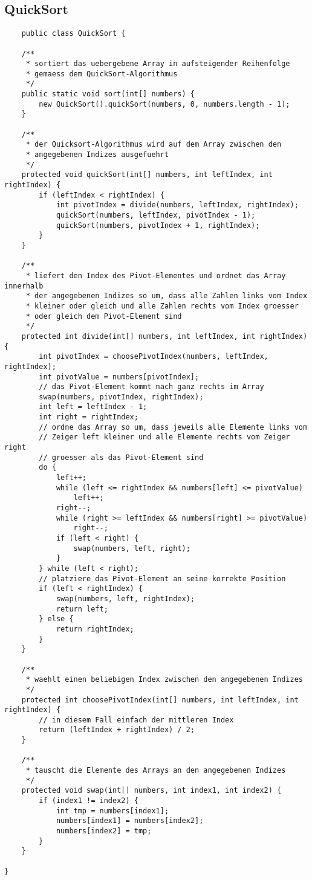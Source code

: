 \documentclass[12pt,a4paper,oneside,ngerman]{article}
\begin{document}
\subsection*{QuickSort}
\begin{lstlisting}
    public class QuickSort {

	/**
	 * sortiert das uebergebene Array in aufsteigender Reihenfolge
	 * gemaess dem QuickSort-Algorithmus
	 */
	public static void sort(int[] numbers) {
		new QuickSort().quickSort(numbers, 0, numbers.length - 1);
	}

	/**
	 * der Quicksort-Algorithmus wird auf dem Array zwischen den
	 * angegebenen Indizes ausgefuehrt
	 */
	protected void quickSort(int[] numbers, int leftIndex, int rightIndex) {
		if (leftIndex < rightIndex) {
			int pivotIndex = divide(numbers, leftIndex, rightIndex);
			quickSort(numbers, leftIndex, pivotIndex - 1);
			quickSort(numbers, pivotIndex + 1, rightIndex);
		}
	}

	/**
	 * liefert den Index des Pivot-Elementes und ordnet das Array innerhalb
	 * der angegebenen Indizes so um, dass alle Zahlen links vom Index
	 * kleiner oder gleich und alle Zahlen rechts vom Index groesser
	 * oder gleich dem Pivot-Element sind
	 */
	protected int divide(int[] numbers, int leftIndex, int rightIndex) {
		int pivotIndex = choosePivotIndex(numbers, leftIndex, rightIndex);
		int pivotValue = numbers[pivotIndex];
		// das Pivot-Element kommt nach ganz rechts im Array
		swap(numbers, pivotIndex, rightIndex);
		int left = leftIndex - 1;
		int right = rightIndex;
		// ordne das Array so um, dass jeweils alle Elemente links vom
		// Zeiger left kleiner und alle Elemente rechts vom Zeiger right
		// groesser als das Pivot-Element sind
		do {
			left++;
			while (left <= rightIndex && numbers[left] <= pivotValue)
				left++;
			right--;
			while (right >= leftIndex && numbers[right] >= pivotValue)
				right--;
			if (left < right) {
				swap(numbers, left, right);
			}
		} while (left < right);
		// platziere das Pivot-Element an seine korrekte Position
		if (left < rightIndex) {
			swap(numbers, left, rightIndex);
			return left;
		} else {
			return rightIndex;
		}
	}

	/**
	 * waehlt einen beliebigen Index zwischen den angegebenen Indizes
	 */
	protected int choosePivotIndex(int[] numbers, int leftIndex, int rightIndex) {
		// in diesem Fall einfach der mittleren Index
		return (leftIndex + rightIndex) / 2;
	}

	/**
	 * tauscht die Elemente des Arrays an den angegebenen Indizes
	 */
	protected void swap(int[] numbers, int index1, int index2) {
		if (index1 != index2) {
			int tmp = numbers[index1];
			numbers[index1] = numbers[index2];
			numbers[index2] = tmp;
		}
	}
	
}

\end{lstlisting}
\end{document}
